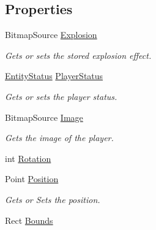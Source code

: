 \subsection*{Properties}
\begin{DoxyCompactItemize}
\item 
Bitmap\+Source \mbox{\hyperlink{class_o_e_invaders_1_1_library_1_1_player_a0a27670a52fd48ae8d37ba2165f45e10}{Explosion}}
\begin{DoxyCompactList}\small\item\em Gets or sets the stored explosion effect. \end{DoxyCompactList}\item 
\mbox{\hyperlink{namespace_o_e_invaders_1_1_library_a31b94a15c65f6baa474008cdade6bdea}{Entity\+Status}} \mbox{\hyperlink{class_o_e_invaders_1_1_library_1_1_player_ae50d2e9865b5ee97946a64140bb3d6e6}{Player\+Status}}
\begin{DoxyCompactList}\small\item\em Gets or sets the player status. \end{DoxyCompactList}\item 
Bitmap\+Source \mbox{\hyperlink{class_o_e_invaders_1_1_library_1_1_player_a4068aac358ca57638aab85043bab4bcb}{Image}}
\begin{DoxyCompactList}\small\item\em Gets the image of the player. \end{DoxyCompactList}\item 
int \mbox{\hyperlink{class_o_e_invaders_1_1_library_1_1_player_a1112de3ad8f25e1dd820b65214b9541b}{Rotation}}
\item 
Point \mbox{\hyperlink{class_o_e_invaders_1_1_library_1_1_player_af6e547cfe36cefe3603d1fd22a87d4d1}{Position}}
\begin{DoxyCompactList}\small\item\em Gets or Sets the position. \end{DoxyCompactList}\item 
Rect \mbox{\hyperlink{class_o_e_invaders_1_1_library_1_1_player_a3b7845a85b40d46cde14117fd6f04d9f}{Bounds}}

\end{DoxyCompactItemize}

